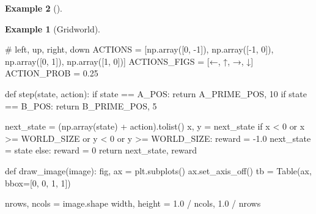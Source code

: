 \documentclass[
  letterpaper,
]{krantz}
\makeatletter
\newenvironment{Shaded}{\begin{snugshade}}{\end{snugshade}}
\newcommand{\CommentTok}[1]{\textcolor[rgb]{0.37,0.37,0.37}{#1}}
\newcommand{\ControlFlowTok}[1]{\textcolor[rgb]{0.00,0.23,0.31}{#1}}
\newcommand{\DecValTok}[1]{\textcolor[rgb]{0.68,0.00,0.00}{#1}}
\newcommand{\FloatTok}[1]{\textcolor[rgb]{0.68,0.00,0.00}{#1}}
\newcommand{\KeywordTok}[1]{\textcolor[rgb]{0.00,0.23,0.31}{#1}}
\newcommand{\NormalTok}[1]{\textcolor[rgb]{0.00,0.23,0.31}{#1}}
\newcommand{\OperatorTok}[1]{\textcolor[rgb]{0.37,0.37,0.37}{#1}}
\newcommand{\StringTok}[1]{\textcolor[rgb]{0.13,0.47,0.30}{#1}}
\newenvironment{kframe}{%
\medskip{}
\setlength{\fboxsep}{.8em}
 \def\at@end@of@kframe{}%
 \ifinner\ifhmode%
  \def\at@end@of@kframe{\end{minipage}}%
  \begin{minipage}{\columnwidth}%
 \fi\fi%
 \def\FrameCommand##1{\hskip\@totalleftmargin \hskip-\fboxsep
 \colorbox{shadecolor}{##1}\hskip-\fboxsep
     \hskip-\linewidth \hskip-\@totalleftmargin \hskip\columnwidth}%
 \MakeFramed {\advance\hsize-\width
   \@totalleftmargin\z@ \linewidth\hsize
   \@setminipage}}%
 {\par\unskip\endMakeFramed%
 \at@end@of@kframe}
\renewenvironment{Shaded}{\begin{kframe}}{\end{kframe}}
\theoremstyle{plain}
\theoremstyle{definition}
\newtheorem{example}{Example}[chapter]
\theoremstyle{definition}
\theoremstyle{remark}
\makeatother
\begin{document}
\begin{example}[]
\begin{example}[Gridworld]
\begin{tcolorbox}[enhanced jigsaw, bottomrule=.15mm, opacityback=0, breakable, colframe=quarto-callout-tip-color-frame, left=2mm, rightrule=.15mm, toprule=.15mm, leftrule=.75mm, arc=.35mm, colback=white]
\begin{codelisting}[H]
\begin{Shaded}
\begin{Highlighting}[]
\CommentTok{\# left, up, right, down}
\NormalTok{ACTIONS }\OperatorTok{=}\NormalTok{ [np.array([}\DecValTok{0}\NormalTok{, }\OperatorTok{{-}}\DecValTok{1}\NormalTok{]),}
\NormalTok{           np.array([}\OperatorTok{{-}}\DecValTok{1}\NormalTok{, }\DecValTok{0}\NormalTok{]),}
\NormalTok{           np.array([}\DecValTok{0}\NormalTok{, }\DecValTok{1}\NormalTok{]),}
\NormalTok{           np.array([}\DecValTok{1}\NormalTok{, }\DecValTok{0}\NormalTok{])]}
\NormalTok{ACTIONS\_FIGS }\OperatorTok{=}\NormalTok{ [}\StringTok{\textquotesingle{}←\textquotesingle{}}\NormalTok{, }\StringTok{\textquotesingle{}↑\textquotesingle{}}\NormalTok{, }\StringTok{\textquotesingle{}→\textquotesingle{}}\NormalTok{, }\StringTok{\textquotesingle{}↓\textquotesingle{}}\NormalTok{]}
\NormalTok{ACTION\_PROB }\OperatorTok{=} \FloatTok{0.25}

\KeywordTok{def}\NormalTok{ step(state, action):}
    \ControlFlowTok{if}\NormalTok{ state }\OperatorTok{==}\NormalTok{ A\_POS:}
        \ControlFlowTok{return}\NormalTok{ A\_PRIME\_POS, }\DecValTok{10}
    \ControlFlowTok{if}\NormalTok{ state }\OperatorTok{==}\NormalTok{ B\_POS:}
        \ControlFlowTok{return}\NormalTok{ B\_PRIME\_POS, }\DecValTok{5}

\NormalTok{    next\_state }\OperatorTok{=}\NormalTok{ (np.array(state) }\OperatorTok{+}\NormalTok{ action).tolist()}
\NormalTok{    x, y }\OperatorTok{=}\NormalTok{ next\_state}
    \ControlFlowTok{if}\NormalTok{ x }\OperatorTok{\textless{}} \DecValTok{0} \KeywordTok{or}\NormalTok{ x }\OperatorTok{\textgreater{}=}\NormalTok{ WORLD\_SIZE }\KeywordTok{or}\NormalTok{ y }\OperatorTok{\textless{}} \DecValTok{0} \KeywordTok{or}\NormalTok{ y }\OperatorTok{\textgreater{}=}\NormalTok{ WORLD\_SIZE:}
\NormalTok{        reward }\OperatorTok{=} \OperatorTok{{-}}\FloatTok{1.0}
\NormalTok{        next\_state }\OperatorTok{=}\NormalTok{ state}
    \ControlFlowTok{else}\NormalTok{:}
\NormalTok{        reward }\OperatorTok{=} \DecValTok{0}
    \ControlFlowTok{return}\NormalTok{ next\_state, reward}


\KeywordTok{def}\NormalTok{ draw\_image(image):}
\NormalTok{    fig, ax }\OperatorTok{=}\NormalTok{ plt.subplots()}
\NormalTok{    ax.set\_axis\_off()}
\NormalTok{    tb }\OperatorTok{=}\NormalTok{ Table(ax, bbox}\OperatorTok{=}\NormalTok{[}\DecValTok{0}\NormalTok{, }\DecValTok{0}\NormalTok{, }\DecValTok{1}\NormalTok{, }\DecValTok{1}\NormalTok{])}

\NormalTok{    nrows, ncols }\OperatorTok{=}\NormalTok{ image.shape}
\NormalTok{    width, height }\OperatorTok{=} \FloatTok{1.0} \OperatorTok{/}\NormalTok{ ncols, }\FloatTok{1.0} \OperatorTok{/}\NormalTok{ nrows}


\end{Highlighting}
\end{Shaded}
\end{codelisting}
\end{tcolorbox}
\end{example}
\end{example}
\end{document}
